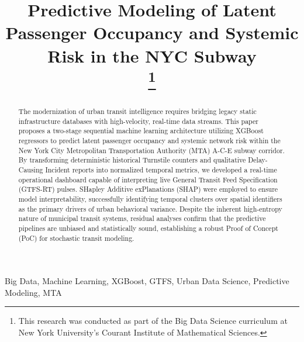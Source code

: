 \documentclass[conference]{IEEEtran}
\begin{document}
\title{Predictive Modeling of Latent Passenger Occupancy and Systemic Risk in the NYC Subway\\
\thanks{This research was conducted as part of the Big Data Science curriculum at New York University's Courant Institute of Mathematical Sciences.}
}

\author{
\and
{}
}

\maketitle

\begin{abstract}
The modernization of urban transit intelligence requires bridging legacy static infrastructure databases with high-velocity, real-time data streams. This paper proposes a two-stage sequential machine learning architecture utilizing XGBoost regressors to predict latent passenger occupancy and systemic network risk within the New York City Metropolitan Transportation Authority (MTA) A-C-E subway corridor. By transforming deterministic historical Turnstile counters and qualitative Delay-Causing Incident reports into normalized temporal metrics, we developed a real-time operational dashboard capable of interpreting live General Transit Feed Specification (GTFS-RT) pulses. SHapley Additive exPlanations (SHAP) were employed to ensure model interpretability, successfully identifying temporal clusters over spatial identifiers as the primary drivers of urban behavioral variance. Despite the inherent high-entropy nature of municipal transit systems, residual analyses confirm that the predictive pipelines are unbiased and statistically sound, establishing a robust Proof of Concept (PoC) for stochastic transit modeling.
\end{abstract}

\begin{IEEEkeywords}
Big Data, Machine Learning, XGBoost, GTFS, Urban Data Science, Predictive Modeling, MTA
\end{IEEEkeywords}
\end{document}
